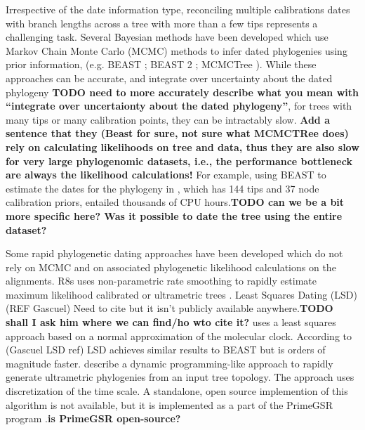 \documentclass{llncs}
\newcommand{\ejmcomment}[1]{{\color{green} #1}}
\begin{document}
Irrespective of the date information type, reconciling multiple calibrations dates with branch lengths across a tree with more than a few tips represents a challenging task.
Several Bayesian methods have been developed which use Markov Chain Monte Carlo (MCMC) methods
to infer dated phylogenies using prior information, 
(e.g. BEAST \citealt{Drummond2007}; BEAST 2 \citealt{bouckaert2014}; MCMCTree \citealt{Stadler2013}).
While these approaches can be accurate, and integrate over uncertainty about the dated
phylogeny {\bf TODO need to more accurately describe what you mean with ``integrate over uncertaionty about the dated phylogeny''}, 
for trees with many tips or many calibration points, they can be intractably slow.
{\bf Add a sentence that they (Beast for sure, not sure what MCMCTRee does) rely on calculating likelihoods on tree and data,
thus they are also slow for very large phylogenomic datasets, i.e., the performance bottleneck are always the likelihood calculations!}
For example, using BEAST to estimate the dates for the phylogeny in \citet{Misof2014}, which has 144 tips
and 37 node calibration priors, entailed thousands of CPU hours.{\bf TODO can we be a bit more specific here? Was it possible to date the tree using the entire dataset?}

Some rapid phylogenetic dating approaches have been developed which do not rely on MCMC and on associated phylogenetic likelihood calculations on the alignments.\@
R8s uses non-parametric rate smoothing to rapidly estimate 
maximum likelihood calibrated or ultrametric trees \citep{Sanderson2003}.
Least Squares Dating (LSD) (REF Gascuel) 
\ejmcomment{Need to cite but it isn't publicly available anywhere.}{\bf TODO shall I ask him where we can find/ho wto cite it?}
uses a least squares approach based on a normal approximation of the molecular clock.
According to (Gascuel LSD ref) LSD achieves similar results to BEAST but is orders of magnitude faster. 
\cite{Akerborg2008} describe a dynamic programming-like approach to 
rapidly generate ultrametric phylogenies from an input tree topology.
The approach uses discretization of the time scale.
A standalone, open source implemention of this algorithm is not available,
but it is implemented as a part of the PrimeGSR program \citep{Akerborg2009}.{\bf is PrimeGSR open-source?}
\end{document}

